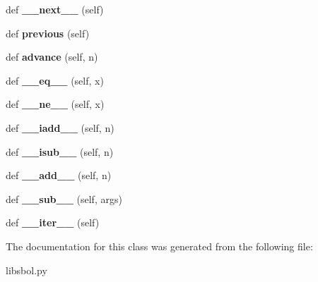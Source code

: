 \begin{DoxyCompactItemize}
\item 
def {\bfseries \+\_\+\+\_\+next\+\_\+\+\_\+} (self)\hypertarget{classsbol_1_1libsbol_1_1_swig_py_iterator_a73c83f8acd4d92b12bdd9522afd2fa50}{}\label{classsbol_1_1libsbol_1_1_swig_py_iterator_a73c83f8acd4d92b12bdd9522afd2fa50}

\item 
def {\bfseries previous} (self)\hypertarget{classsbol_1_1libsbol_1_1_swig_py_iterator_aa2ffb2c158cff2fb07e44f3624766cce}{}\label{classsbol_1_1libsbol_1_1_swig_py_iterator_aa2ffb2c158cff2fb07e44f3624766cce}

\item 
def {\bfseries advance} (self, n)\hypertarget{classsbol_1_1libsbol_1_1_swig_py_iterator_a57a2678db39b38bbcdaa257ffce1bc1e}{}\label{classsbol_1_1libsbol_1_1_swig_py_iterator_a57a2678db39b38bbcdaa257ffce1bc1e}

\item 
def {\bfseries \+\_\+\+\_\+eq\+\_\+\+\_\+} (self, x)\hypertarget{classsbol_1_1libsbol_1_1_swig_py_iterator_aec1dd675a0e7a5a2d39d3e25b039218f}{}\label{classsbol_1_1libsbol_1_1_swig_py_iterator_aec1dd675a0e7a5a2d39d3e25b039218f}

\item 
def {\bfseries \+\_\+\+\_\+ne\+\_\+\+\_\+} (self, x)\hypertarget{classsbol_1_1libsbol_1_1_swig_py_iterator_aaff5739ad766a00909b6518d5e5a04d5}{}\label{classsbol_1_1libsbol_1_1_swig_py_iterator_aaff5739ad766a00909b6518d5e5a04d5}

\item 
def {\bfseries \+\_\+\+\_\+iadd\+\_\+\+\_\+} (self, n)\hypertarget{classsbol_1_1libsbol_1_1_swig_py_iterator_ae733a5a840d3828f692612cfecd69e6c}{}\label{classsbol_1_1libsbol_1_1_swig_py_iterator_ae733a5a840d3828f692612cfecd69e6c}

\item 
def {\bfseries \+\_\+\+\_\+isub\+\_\+\+\_\+} (self, n)\hypertarget{classsbol_1_1libsbol_1_1_swig_py_iterator_a7287687319196fde0a4c9bf0897554ab}{}\label{classsbol_1_1libsbol_1_1_swig_py_iterator_a7287687319196fde0a4c9bf0897554ab}

\item 
def {\bfseries \+\_\+\+\_\+add\+\_\+\+\_\+} (self, n)\hypertarget{classsbol_1_1libsbol_1_1_swig_py_iterator_a9b9e8b0b7265f7c496414012737b6544}{}\label{classsbol_1_1libsbol_1_1_swig_py_iterator_a9b9e8b0b7265f7c496414012737b6544}

\item 
def {\bfseries \+\_\+\+\_\+sub\+\_\+\+\_\+} (self, args)\hypertarget{classsbol_1_1libsbol_1_1_swig_py_iterator_a420da12970e5bcc1772b4e529cbf2a17}{}\label{classsbol_1_1libsbol_1_1_swig_py_iterator_a420da12970e5bcc1772b4e529cbf2a17}

\item 
def {\bfseries \+\_\+\+\_\+iter\+\_\+\+\_\+} (self)\hypertarget{classsbol_1_1libsbol_1_1_swig_py_iterator_aae40e5e5fb7aa33667aa4ee903e1ec55}{}\label{classsbol_1_1libsbol_1_1_swig_py_iterator_aae40e5e5fb7aa33667aa4ee903e1ec55}

\end{DoxyCompactItemize}


The documentation for this class was generated from the following file\+:\begin{DoxyCompactItemize}
\item 
libsbol.\+py\end{DoxyCompactItemize}
